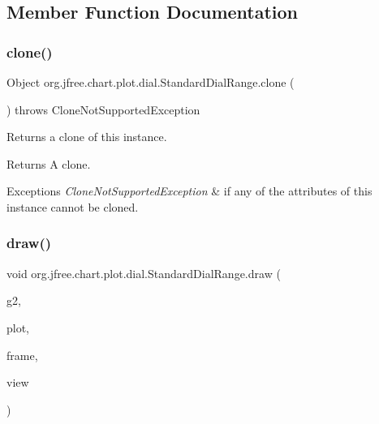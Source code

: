 \subsection{Member Function Documentation}
\mbox{\label{classorg_1_1jfree_1_1chart_1_1plot_1_1dial_1_1_standard_dial_range_a2b54026fb460d5c1cb6463812ee5dd8b}} 
\subsubsection{\texorpdfstring{clone()}{clone()}}
{\footnotesize\ttfamily Object org.\+jfree.\+chart.\+plot.\+dial.\+Standard\+Dial\+Range.\+clone (\begin{DoxyParamCaption}{ }\end{DoxyParamCaption}) throws Clone\+Not\+Supported\+Exception}

Returns a clone of this instance.

\begin{DoxyReturn}{Returns}
A clone.
\end{DoxyReturn}

\begin{DoxyExceptions}{Exceptions}
{\em Clone\+Not\+Supported\+Exception} & if any of the attributes of this instance cannot be cloned. \\
\hline
\end{DoxyExceptions}
\mbox{\label{classorg_1_1jfree_1_1chart_1_1plot_1_1dial_1_1_standard_dial_range_a2a505dac3b8a9cec54e872e9165348cc}} 
\subsubsection{\texorpdfstring{draw()}{draw()}}
{\footnotesize\ttfamily void org.\+jfree.\+chart.\+plot.\+dial.\+Standard\+Dial\+Range.\+draw (\begin{DoxyParamCaption}\item[{Graphics2D}]{g2,  }\item[{\mbox{\hyperlink{classorg_1_1jfree_1_1chart_1_1plot_1_1dial_1_1_dial_plot}{Dial\+Plot}}}]{plot,  }\item[{Rectangle2D}]{frame,  }\item[{Rectangle2D}]{view }\end{DoxyParamCaption})}


